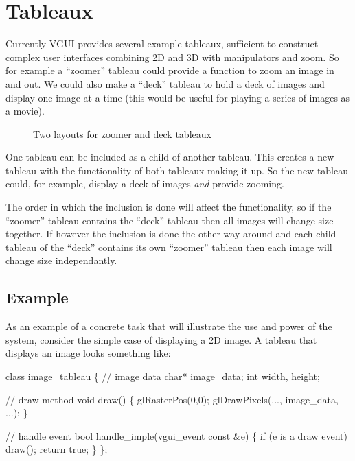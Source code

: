 \documentclass[12pt]{report} \usepackage{epsfig}
\begin{document}
\chapter{Tableaux}

Currently VGUI provides several example tableaux, sufficient to
construct complex user interfaces combining 2D and 3D with manipulators and zoom.
So for example a ``zoomer'' tableau could provide a function to zoom an image in and out.
We could also make a ``deck'' tableau to hold a deck of images and display one image at 
a time (this would be useful for playing a series of images as a movie).

\begin{figure}[htb]
  \caption{Two layouts for zoomer and deck tableaux}
  \label{fig1}
\end{figure}
 
One tableau can be included as a child of another tableau.  This creates a new 
tableau with the functionality of both tableaux making it up.
So the new tableau could, for example, display a deck of images {\it and} provide zooming.  

The order in which the inclusion is done will affect the functionality, so if the
``zoomer'' tableau contains the ``deck'' tableau then all images will change
size together.  If however the inclusion is done the other way around and each
child tableau of the ``deck'' contains its own ``zoomer'' tableau
then each image will change size independantly.

\section{Example}

As an example of a concrete task that will illustrate the use and power of
the system, consider the simple case of displaying a 2D image.  A tableau
that displays an image looks something like:
 
{\scriptsize \begin{verbawf}
  class image\_tableau 
  \{
    // image data
    char* image\_data;
    int width, height;
 
    // draw method
    void draw() 
    \{
      glRasterPos(0,0);
      glDrawPixels(..., image\_data, ...);
     \}

    // handle event
    bool handle_imple(vgui_event const &e)
    \{
      if (e is a draw event)
        draw();
      return true;
    \}
  \};
\end{verbawf}}
 
\end{document}
